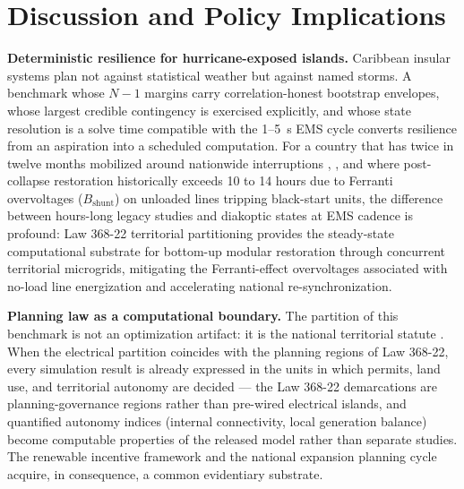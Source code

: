 \section{Discussion and Policy Implications}
\label{sec:discussion}

\textbf{Deterministic resilience for hurricane-exposed islands.} Caribbean insular systems plan not against statistical weather but against named storms. A benchmark whose $N-1$ margins carry correlation-honest bootstrap envelopes, whose largest credible contingency is exercised explicitly, and whose state resolution is a solve time compatible with the 1--5~s EMS cycle converts resilience from an aspiration into a scheduled computation. For a country that has twice in twelve months mobilized around nationwide interruptions \cite{ocseni}, \cite{diarioLibreHainamosa_2026}, and where post-collapse restoration historically exceeds 10 to 14 hours due to Ferranti overvoltages ($B_{\mathrm{shunt}}$) on unloaded lines tripping black-start units, the difference between hours-long legacy studies and diakoptic states at EMS cadence is profound: Law 368-22 territorial partitioning provides the steady-state computational substrate for bottom-up modular restoration through concurrent territorial microgrids, mitigating the Ferranti-effect overvoltages associated with no-load line energization and accelerating national re-synchronization.

\textbf{Planning law as a computational boundary.} The partition of this benchmark is not an optimization artifact: it is the national territorial statute \cite{ley368}. When the electrical partition coincides with the planning regions of Law 368-22, every simulation result is already expressed in the units in which permits, land use, and territorial autonomy are decided --- the Law 368-22 demarcations are planning-governance regions rather than pre-wired electrical islands, and quantified autonomy indices (internal connectivity, local generation balance) become computable properties of the released model rather than separate studies. The renewable incentive framework \cite{ley57} and the national expansion planning cycle \cite{cne2022} acquire, in consequence, a common evidentiary substrate.

